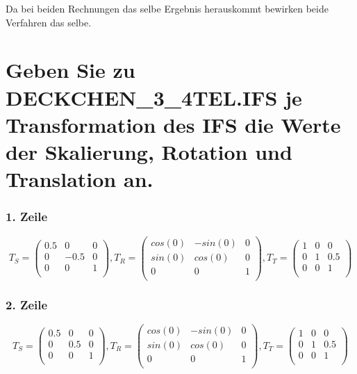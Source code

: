\documentclass[]{article}
\begin{document}
 Da bei beiden Rechnungen das selbe Ergebnis herauskommt bewirken beide Verfahren das selbe.
\section{Geben Sie zu DECKCHEN\_3\_4TEL.IFS je Transformation des IFS die Werte der Skalierung, Rotation und Translation an. }
\subsubsection*{1. Zeile}
\[
T_S = \begin{pmatrix}
 	0.5 & 0 & 0 \\
 	0 & -0.5 & 0 \\
 	0 & 0 & 1 \\
 \end{pmatrix},
 T_R = \begin{pmatrix}
 cos(0) & -sin(0) & 0 \\
 sin(0) & cos(0) & 0 \\
 0 & 0 & 1 \\
 \end{pmatrix},
 T_T = \begin{pmatrix}
 1 & 0 & 0 \\
 0 & 1 & 0.5 \\
 0 & 0 & 1 \\
 \end{pmatrix}
 \]
 
 \subsubsection*{2. Zeile}
\[
T_S = \begin{pmatrix}
0.5 & 0 & 0 \\
0 & 0.5 & 0 \\
0 & 0 & 1 \\
\end{pmatrix},
T_R = \begin{pmatrix}
cos(0) & -sin(0) & 0 \\
sin(0) & cos(0) & 0 \\
0 & 0 & 1 \\
\end{pmatrix},
T_T = \begin{pmatrix}
1 & 0 & 0 \\
0 & 1 & 0.5 \\
0 & 0 & 1 \\
\end{pmatrix}
\]
 
\end{document}
